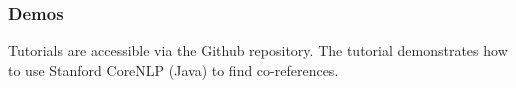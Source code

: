 \documentclass{KBook}
\begin{document}
\subsubsection*{Demos}

Tutorials are accessible via the Github repository.
The tutorial demonstrates how to use Stanford CoreNLP (Java) to find co-references.




\ifx\wholebook\relax\else
% 
% 
	
\end{document}
